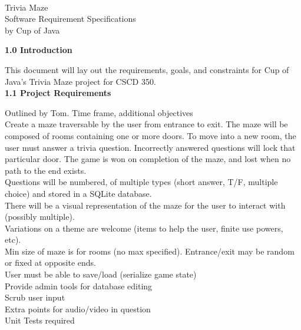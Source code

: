 \documentclass[12pt]{article}
\begin{document}
\noindent
\thispagestyle{empty}
\LARGE \\
Trivia Maze\\
Software Requirement Specifications\\
by Cup of Java\\

\pagebreak

\noindent
\normalsize
\textbf{\Large 1.0 Introduction}

This document will lay out the requirements, goals, and constraints for Cup of Java's Trivia Maze project for CSCD 350.\\

\textbf{\Large1.1 Project Requirements}

Outlined by Tom. Time frame, additional objectives\\

Create a maze traversable by the user from entrance to exit. The maze will be composed of rooms containing one or more doors. To move into a new room, the user must answer a trivia question. Incorrectly answered questions will lock that particular door. The game is won on completion of the maze, and lost when no path to the end exists.\\

Questions will be numbered, of multiple types (short answer, T/F, multiple choice) and stored in a SQLite database.\\

There will be a visual representation of the maze for the user to interact with (possibly multiple).\\

Variations on a theme are welcome (items to help the user, finite use powers, etc).\\

Min size of maze is for rooms (no max specified). Entrance/exit may be random or fixed at opposite ends.\\

User must be able to save/load (serialize game state)\\

Provide admin tools for database editing\\

Scrub user input\\

Extra points for audio/video in question\\

Unit Tests required\\
\end{document}
